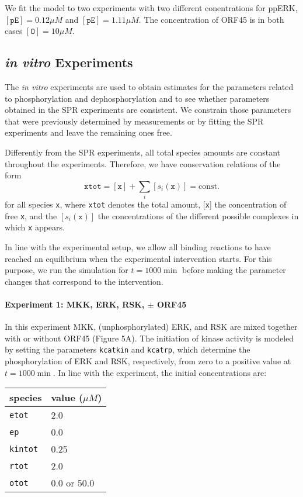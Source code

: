 \documentclass[12pt]{article}
\begin{document}
	We fit the model to two experiments with two different conentrations
	for ppERK, $[\texttt{pE}]=0.12\mu M$ and $[\texttt{pE}]=1.11\mu M$.
	The concentration of ORF45 is in both cases $[\texttt{O}]=10\mu M$.
	
	\subsection{\textit{in vitro} Experiments}
	
	The \textit{in vitro} experiments are used to obtain estimates for
	the parameters related to phosphorylation and dephosphorylation and
	to see whether parameters obtained in the SPR experiments are consistent.
	We constrain those parameters that were previously determined by measurements
	or by fitting the SPR experiments and leave the remaining ones free.
	
	Differently from the SPR experiments, all total species amounts are
	constant throughout the experiments. Therefore, we have conservation
	relations of the form 
	\begin{equation}
		\texttt{xtot}=[\texttt{x}]+\sum_{i}[s_{i}(\texttt{x})]=\text{const.}
	\end{equation}
	for all species \texttt{x}, where \texttt{xtot} denotes the total
	amount, {[}\texttt{x}{]} the concentration of free \texttt{x}, and
	the $[s_{i}(\texttt{x})]$ the concentrations of the different possible
	complexes in which \texttt{x} appears.
	
	In line with the experimental setup, we allow all binding reactions
	to have reached an equilibrium when the experimental intervention
	starts. For this purpose, we run the simulation for $t=1000\min$
	before making the parameter changes that correspond to the intervention.
	
	\paragraph{Experiment 1: MKK, ERK, RSK, $\pm$ ORF45}
	
	In this experiment MKK, (unphosphorylated) ERK, and RSK are mixed
	together with or without ORF45 (Figure 5A). The initiation of kinase
	activity is modeled by setting the parameters \texttt{kcatkin} and
	\texttt{kcatrp}, which determine the phosphorylation of ERK and RSK,
	respectively, from zero to a positive value at $t=1000\min$. In line
	with the experiment, the initial concentrations are: 
	\begin{center}
		\begin{tabular}{ll}
			species  & value ($\mu M$)\\
			\midrule 
			\texttt{etot}  & 2.0\\
			\texttt{ep}  & 0.0 \\
			\texttt{kintot}  & 0.25\\
			\texttt{rtot}  & 2.0 \\
			\texttt{otot}  & 0.0 or 50.0\\
		\end{tabular}
		\par\end{center}
	
\end{document}
